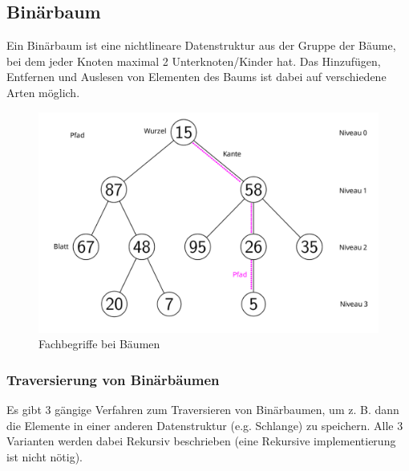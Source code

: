 \subsection{Binärbaum}

Ein Binärbaum ist eine nichtlineare Datenstruktur aus der Gruppe der Bäume, bei dem
jeder Knoten maximal 2 Unterknoten/Kinder hat. Das Hinzufügen, Entfernen und Auslesen
von Elementen des Baums ist dabei auf verschiedene Arten möglich.

\begin{figure}[H]
    \centering
    \includegraphics[width=1\textwidth]{images/baum_begriffe.png}
    \caption{Fachbegriffe bei Bäumen}
\end{figure}


\subsubsection{Traversierung von Binärbäumen}

Es gibt 3 gängige Verfahren zum Traversieren von Binärbaumen, um z. B. dann die Elemente
in einer anderen Datenstruktur (e.g. Schlange) zu speichern.
Alle 3 Varianten werden dabei Rekursiv beschrieben (eine Rekursive implementierung ist nicht nötig).





